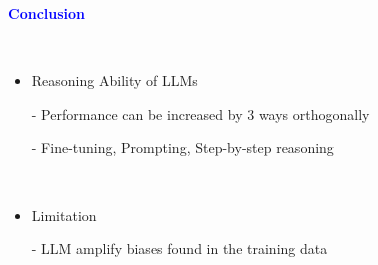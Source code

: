 \documentclass[professionalfont]{beamer}
\begin{document}
\begin{frame}
\begin{center}
    { \textbf{\textcolor{blue}{ {\fontsize{12}{14}\selectfont Conclusion} }} }
\end{center}
\\[0.3cm]

{\fontsize{10}{14}\selectfont 
\begin{itemize}
    \item Reasoning Ability of LLMs

    - Performance can be increased by 3 ways orthogonally

    - Fine-tuning, Prompting, Step-by-step reasoning

    \\[0.3cm]

    \item Limitation

    - LLM amplify biases found in the training data

\end{itemize}
}

\end{frame}
\end{document}
